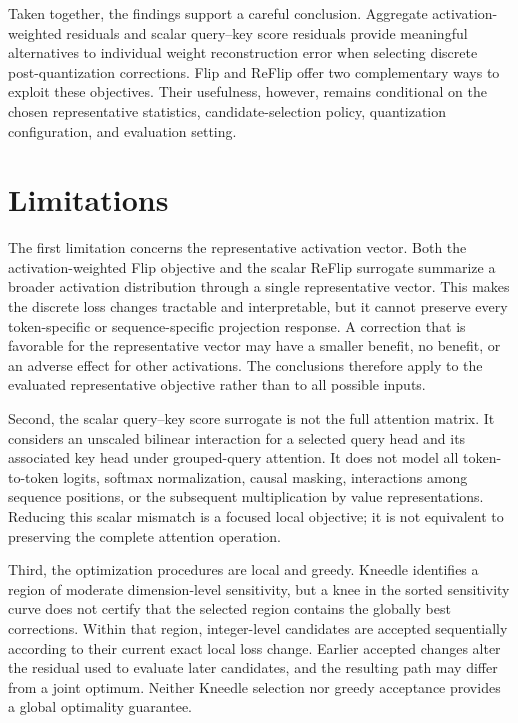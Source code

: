 \documentclass[../main.tex]{subfiles}
\begin{document}
Taken together, the findings support a careful conclusion. Aggregate activation-weighted residuals and scalar query--key score residuals provide meaningful alternatives to individual weight reconstruction error when selecting discrete post-quantization corrections. Flip and ReFlip offer two complementary ways to exploit these objectives. Their usefulness, however, remains conditional on the chosen representative statistics, candidate-selection policy, quantization configuration, and evaluation setting.

\section{Limitations}

The first limitation concerns the representative activation vector. Both the activation-weighted Flip objective and the scalar ReFlip surrogate summarize a broader activation distribution through a single representative vector. This makes the discrete loss changes tractable and interpretable, but it cannot preserve every token-specific or sequence-specific projection response. A correction that is favorable for the representative vector may have a smaller benefit, no benefit, or an adverse effect for other activations. The conclusions therefore apply to the evaluated representative objective rather than to all possible inputs.

Second, the scalar query--key score surrogate is not the full attention matrix. It considers an unscaled bilinear interaction for a selected query head and its associated key head under grouped-query attention. It does not model all token-to-token logits, softmax normalization, causal masking, interactions among sequence positions, or the subsequent multiplication by value representations. Reducing this scalar mismatch is a focused local objective; it is not equivalent to preserving the complete attention operation.

Third, the optimization procedures are local and greedy. Kneedle identifies a region of moderate dimension-level sensitivity, but a knee in the sorted sensitivity curve does not certify that the selected region contains the globally best corrections. Within that region, integer-level candidates are accepted sequentially according to their current exact local loss change. Earlier accepted changes alter the residual used to evaluate later candidates, and the resulting path may differ from a joint optimum. Neither Kneedle selection nor greedy acceptance provides a global optimality guarantee.
\end{document}
